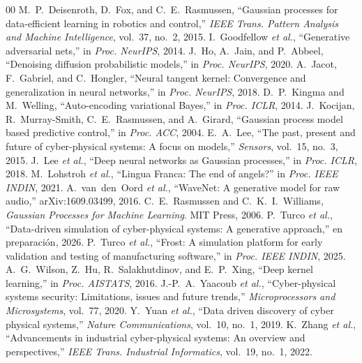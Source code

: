 \documentclass[conference]{IEEEtran}
\begin{document}
\begin{thebibliography}{00}
 M.~P.~Deisenroth, D.~Fox, and C.~E.~Rasmussen, ``Gaussian processes for data-efficient learning in robotics and control,'' \textit{IEEE Trans. Pattern Analysis and Machine Intelligence}, vol.~37, no.~2, 2015.
 I.~Goodfellow \textit{et al.}, ``Generative adversarial nets,'' in \textit{Proc. NeurIPS}, 2014.
 J.~Ho, A.~Jain, and P.~Abbeel, ``Denoising diffusion probabilistic models,'' in \textit{Proc. NeurIPS}, 2020.
 A.~Jacot, F.~Gabriel, and C.~Hongler, ``Neural tangent kernel: Convergence and generalization in neural networks,'' in \textit{Proc. NeurIPS}, 2018.
 D.~P.~Kingma and M.~Welling, ``Auto-encoding variational Bayes,'' in \textit{Proc. ICLR}, 2014.
 J.~Kocijan, R.~Murray-Smith, C.~E.~Rasmussen, and A.~Girard, ``Gaussian process model based predictive control,'' in \textit{Proc. ACC}, 2004.
 E.~A.~Lee, ``The past, present and future of cyber-physical systems: A focus on models,'' \textit{Sensors}, vol.~15, no.~3, 2015.
 J.~Lee \textit{et al.}, ``Deep neural networks as Gaussian processes,'' in \textit{Proc. ICLR}, 2018.
 M.~Lohstroh \textit{et al.}, ``Lingua Franca: The end of angels?'' in \textit{Proc. IEEE INDIN}, 2021.
 A.~van~den~Oord \textit{et al.}, ``WaveNet: A generative model for raw audio,'' arXiv:1609.03499, 2016.
 C.~E.~Rasmussen and C.~K.~I.~Williams, \textit{Gaussian Processes for Machine Learning}. MIT Press, 2006.
 P.~Turco \textit{et al.}, ``Data-driven simulation of cyber-physical systems: A generative approach,'' en preparación, 2026.
 P.~Turco \textit{et al.}, ``Frost: A simulation platform for early validation and testing of manufacturing software,'' in \textit{Proc. IEEE INDIN}, 2025.
 A.~G.~Wilson, Z.~Hu, R.~Salakhutdinov, and E.~P.~Xing, ``Deep kernel learning,'' in \textit{Proc. AISTATS}, 2016.
 J.-P.~A.~Yaacoub \textit{et al.}, ``Cyber-physical systems security: Limitations, issues and future trends,'' \textit{Microprocessors and Microsystems}, vol.~77, 2020.
 Y.~Yuan \textit{et al.}, ``Data driven discovery of cyber physical systems,'' \textit{Nature Communications}, vol.~10, no.~1, 2019.
 K.~Zhang \textit{et al.}, ``Advancements in industrial cyber-physical systems: An overview and perspectives,'' \textit{IEEE Trans. Industrial Informatics}, vol.~19, no.~1, 2022.
\end{thebibliography}
\end{document}
